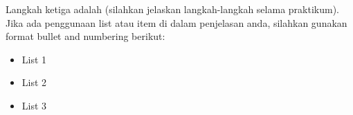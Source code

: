 \item Langkah ketiga adalah (silahkan jelaskan langkah-langkah
      selama praktikum). Jika ada penggunaan list atau item di dalam
      penjelasan anda, silahkan gunakan format bullet and numbering berikut:
      \begin{itemize}
        \item List 1
        \item List 2
        \item List 3
      \end{itemize}